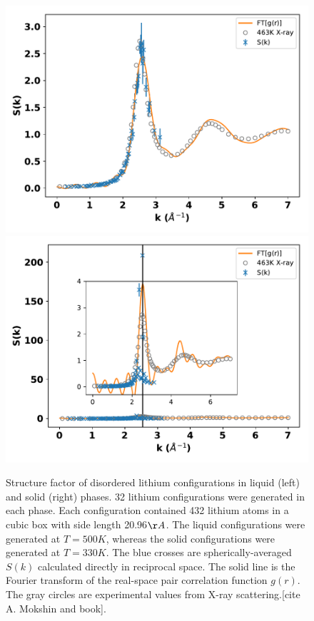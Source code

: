 \documentclass[aps,prl,superscriptaddress]{revtex4-1}
\begin{document}
\begin{figure}[h]
\includegraphics[scale=0.48]{figures/009d_amass-cont1_t500}
\includegraphics[scale=0.48]{figures/009d_amass-temp330}
\caption{Structure factor of disordered lithium configurations in liquid (left) and solid (right) phases. 32 lithium configurations were generated in each phase. Each configuration contained 432 lithium atoms in a cubic box with side length 20.96$\AA$. The liquid configurations were generated at $T=500K$, whereas the solid configurations were generated at $T=330K$. The blue crosses are spherically-averaged $S(k)$ calculated directly in reciprocal space. The solid line is the Fourier transform of the real-space pair correlation function $g(r)$. The gray circles are experimental values from X-ray scattering.[cite A. Mokshin and book].\label{fig:lisk}}
\end{figure}
\end{document}
